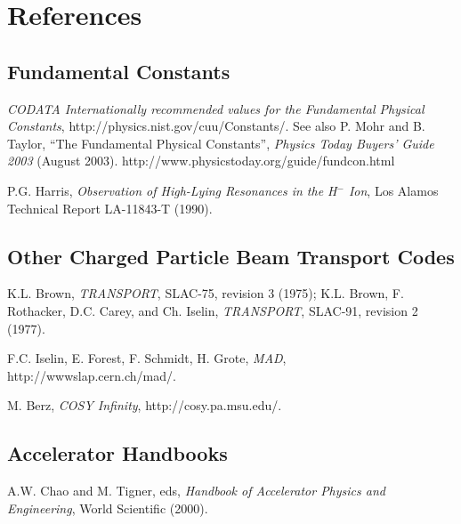 
\chapter{References}

\section{Fundamental Constants} 
\begin{description}
\item {\em CODATA Internationally recommended values for the Fundamental Physical Constants}, http://physics.nist.gov/cuu/Constants/.  See also P. Mohr and B. Taylor, ``The Fundamental Physical Constants'', {\em Physics Today Buyers' Guide 2003} (August 2003).  http://www.physicstoday.org/guide/fundcon.html
\item P.G. Harris, {\em Observation of High-Lying Resonances in the H$^-$ Ion},
Los Alamos Technical Report LA-11843-T (1990).
\end{description}
\section{Other Charged Particle Beam Transport Codes}
\begin{description}
\item K.L. Brown, {\em TRANSPORT}, SLAC-75, revision 3 (1975); K.L. Brown, F. Rothacker, D.C.
    Carey, and Ch. Iselin, {\em TRANSPORT}, SLAC-91, revision 2 (1977).
\item F.C. Iselin, E. Forest, F. Schmidt, H. Grote, {\em MAD}, http://wwwslap.cern.ch/mad/.
\item M. Berz, {\em COSY Infinity}, http://cosy.pa.msu.edu/.  
\end{description}
\section{Accelerator Handbooks}
\begin{description}
\item A.W. Chao and M. Tigner, eds, {\em Handbook of Accelerator Physics and Engineering},  World Scientific (2000).
\end{description}

